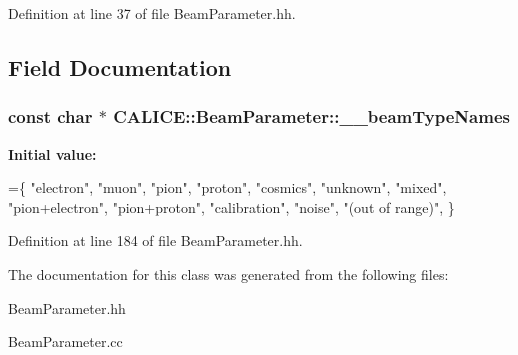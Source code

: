 Definition at line 37 of file Beam\-Parameter.\-hh.



\subsection{Field Documentation}
\subsubsection[{\-\_\-\-\_\-beam\-Type\-Names}]{\setlength{\rightskip}{0pt plus 5cm}const char $\ast$ C\-A\-L\-I\-C\-E\-::\-Beam\-Parameter\-::\-\_\-\-\_\-beam\-Type\-Names\hspace{0.3cm}{\ttfamily [static]}}\label{classCALICE_1_1BeamParameter_a5bab90e1ec133f8427213561be2fc669}
{\bfseries Initial value\-:}
\begin{DoxyCode}
=\{
    \textcolor{stringliteral}{"electron"},
    \textcolor{stringliteral}{"muon"},
    \textcolor{stringliteral}{"pion"},
    \textcolor{stringliteral}{"proton"},
    \textcolor{stringliteral}{"cosmics"},
    \textcolor{stringliteral}{"unknown"},
    \textcolor{stringliteral}{"mixed"}, 
    \textcolor{stringliteral}{"pion+electron"},
    \textcolor{stringliteral}{"pion+proton"},
    \textcolor{stringliteral}{"calibration"},
    \textcolor{stringliteral}{"noise"},
    \textcolor{stringliteral}{"(out of range)"},
  \}
\end{DoxyCode}


Definition at line 184 of file Beam\-Parameter.\-hh.



The documentation for this class was generated from the following files\-:\begin{DoxyCompactItemize}
\item 
Beam\-Parameter.\-hh\item 
Beam\-Parameter.\-cc\end{DoxyCompactItemize}
